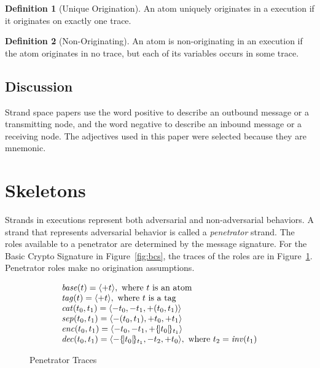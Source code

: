 \documentclass[12pt]{article}
\theoremstyle{definition}
\newtheorem{defn}{Definition}[section]
\begin{document}
\begin{defn}[Unique Origination]
An atom uniquely originates in a execution if it originates on exactly
one trace.
\end{defn}

\begin{defn}[Non-Originating]
An atom is non-originating in an execution if the atom originates in
no trace, but each of its variables occurs in some trace.
\end{defn}

\subsection*{Discussion}

Strand space papers use the word positive to describe an outbound
message or a transmitting node, and the word negative to describe an
inbound message or a receiving node.  The adjectives used in this
paper were selected because they are mnemonic.

\section{Skeletons}\label{sec:skeletons}

Strands in executions represent both adversarial and non-adversarial
behaviors.  A strand that represents adversarial behavior is called a
\emph{penetrator} strand.  The roles
available to a penetrator are determined by the message signature.
For the Basic Crypto Signature in Figure~\ref{fig:bcs}, the traces of
the roles are in Figure~\ref{fig:pen}.  Penetrator roles make no
origination assumptions.

\begin{figure}
$$\begin{array}{l}
\operatorname{\mathit{base}}(t)=\langle\mathord + t\rangle,\mbox{ where $t$ is an atom}\\
\operatorname{\mathit{tag}}(t)=\langle\mathord + t\rangle,\mbox{ where $t$ is a tag}\\
\operatorname{\mathit{cat}}(t_0,t_1)=\langle\mathord - t_0,\mathord - t_1, \mathord +(t_0,
  t_1)\rangle\\
\operatorname{\mathit{sep}}(t_0,t_1)=\langle\mathord -(t_0, t_1),\mathord +
    t_0,\mathord + t_1\rangle\\
\operatorname{\mathit{enc}}(t_0,t_1)=\langle\mathord - t_0,\mathord - t_1,
\mathord +\{\!|t_0|\!\}_{t_1}\rangle\\
\operatorname{\mathit{dec}}(t_0,t_1)=\langle\mathord -\{\!|t_0|\!\}_{t_1},
\mathord - t_2,\mathord + t_0\rangle,\mbox{ where $t_2=\operatorname{\mathit{inv}}(t_1)$}
\end{array}$$
\caption{Penetrator Traces}\label{fig:pen}
\end{figure}
\end{document}
